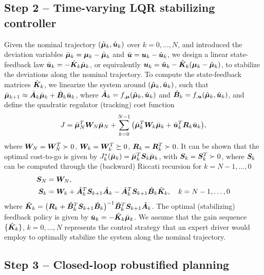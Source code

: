 \subsection{Step 2 -- Time-varying LQR stabilizing controller}
\label{sec:LQR}

Given the nominal trajectory $(\hbmu_k, \hbu_k)$ over $k=0,\ldots, N$, and introduced the deviation variables $\bbmu_k=\bmu_k - \hbmu_k$ and $\bbu = \bu_k - \hbu_k$, we design a linear state-feedback law $\bbu_k= -\hbK_k \bbmu_k$, or equivalently $\bu_k = \hbu_k - \hbK_k (\bmu_k - \hbmu_k)$, to stabilize the deviations along the nominal trajectory. To compute the state-feedback matrices $\hbK_k$, we linearize the system around $(\hbmu_k, \hbu_k)$, such that $\bbmu_{k+1} \approx \hbA_{k}\bbmu_k + \hbB_k \bbu_k$, where $\hbA_k = f_{,\bmu}(\hbmu_k,\hbu_k)$ and $\hbB_k = f_{,\bu}(\hbmu_k,\hbu_k)$, and define the quadratic regulator (tracking) cost function
\begin{align}
J = \bbmu_N^T \bW_N \bbmu_N + \sum_{k=0}^{N-1} \big( \bbmu_k^{T} \bW_k \bbmu_k + \bbu_k^T \bR_k \bbu_k \big),
\end{align}
where $\bW_N=\bW_N^T \succ 0$, $\bW_k=\bW_k^T \succeq 0$, $\bR_k=\bR_k^T \succ 0$. It can be shown that the optimal cost-to-go is given by $J_k^*(\bbmu_k) = \bbmu_k^T \bS_k \bbmu_k$, with $\bS_k = \bS_k^T \succ 0$, where $\bS_k$ can be computed through the (backward) Riccati recursion for $k=N-1,\ldots, 0$
\begin{align}
\bS_N &= \bW_N,\\ 
\bS_{k} &= \bW_k + \hbA_k^T \bS_{k+1} \hbA_k - \hbA_k^T \bS_{k+1}\hbB_k \hbK_k,\quad k={N-1, \ldots, 0}
\end{align}
where  $\hbK_k =\big( \bR_k+\hbB_k^T \bS_{k+1} \hbB_k \big)^{-1} \hbB_k^T \bS_{k+1} \hbA_k$. The optimal (stabilizing) feedback policy is given by $\bbu_k=-\hbK_k \bbmu_k$. We assume that the gain sequence $\{\hbK_k\}$, $k=0,\ldots, N$ represents the control strategy that an expert driver would employ to optimally stabilize the system along the nominal trajectory.

\subsection{Step 3 -- Closed-loop robustified planning}
\label{sec:CLrobustified}


